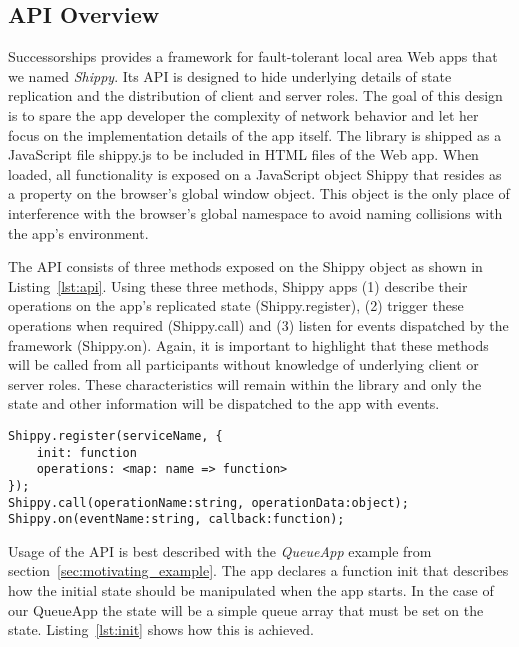 \subsection{API Overview}
\label{sub:approach_api_overview}

Successorships provides a framework for fault-tolerant local area Web apps that we named \textit{Shippy}.
Its API is designed to hide underlying details of state replication and the distribution of client and server roles.
The goal of this design is to spare the app developer the complexity of network behavior and let her focus on the implementation details of the app itself.
The library is shipped as a JavaScript file {\ttfamily shippy.js} to be included in HTML files of the Web app.
When loaded, all functionality is exposed on a JavaScript object {\ttfamily Shippy} that resides as a property on the browser's global {\ttfamily window} object.
This object is the only place of interference with the browser's global namespace to avoid naming collisions with the app's environment.

The API consists of three methods exposed on the {\ttfamily Shippy} object as shown in Listing~\ref{lst:api}.
Using these three methods, Shippy apps (1) describe their operations on the app's replicated state ({\ttfamily Shippy.register}), (2) trigger these operations when required ({\ttfamily Shippy.call}) and (3) listen for events dispatched by the framework ({\ttfamily Shippy.on}).
Again, it is important to highlight that these methods will be called from all participants without knowledge of underlying client or server roles. These characteristics will remain within the library and only the state and other information will be dispatched to the app with events.

\begin{lstlisting}[caption={Successorships API},label={lst:api}]
Shippy.register(serviceName, {
    init: function
    operations: <map: name => function>
});
Shippy.call(operationName:string, operationData:object);
Shippy.on(eventName:string, callback:function);
\end{lstlisting}

Usage of the API is best described with the \textit{QueueApp} example from section~\ref{sec:motivating_example}. The app declares a function {\ttfamily init} that describes how the initial state should be manipulated when the app starts. In the case of our QueueApp the state will be a simple queue array that must be set on the state. Listing~\ref{lst:init} shows how this is achieved.

